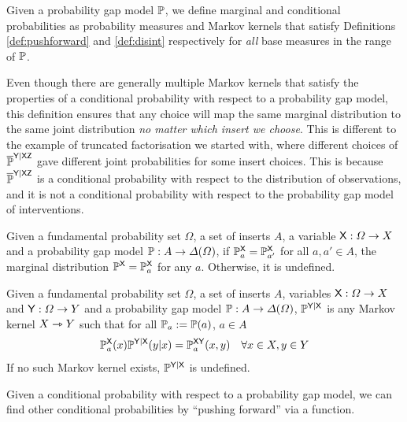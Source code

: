 Given a probability gap model $\mathbb{P}$, we define marginal and conditional probabilities as probability measures and Markov kernels that satisfy Definitions \ref{def:pushforward} and \ref{def:disint} respectively for \emph{all} base measures in the range of $\mathbb{P}$. 

Even though there are generally multiple Markov kernels that satisfy the properties of a conditional probability with respect to a probability gap model, this definition ensures that any choice will map the same marginal distribution to the same joint distribution \emph{no matter which insert we choose}. This is different to the example of truncated factorisation we started with, where different choices of $\overline{\mathbb{P}}^{\mathsf{Y}|\mathsf{XZ}}$ gave different joint probabilities for some insert choices. This is because $\overline{\mathbb{P}}^{\mathsf{Y}|\mathsf{XZ}}$ is a conditional probability with respect to the distribution of observations, and it is not a conditional probability with respect to the probability gap model of interventions.

\begin{definition}
Given a fundamental probability set $\Omega$, a set of inserts $A$, a variable $\mathsf{X}:\Omega\to X$ and a probability gap model $\mathbb{P}:A\to \Delta(\Omega)$, if $\mathbb{P}_a^{\mathsf{X}}=\mathbb{P}_{a'}^{\mathsf{X}}$ for all $a,a'\in A$, the marginal distribution $\mathbb{P}^{\mathsf{X}}=\mathbb{P}_a^{\mathsf{X}}$ for any $a$. Otherwise, it is undefined.
\end{definition}

\begin{definition}
Given a fundamental probability set $\Omega$, a set of inserts $A$, variables $\mathsf{X}:\Omega\to X$ and $\mathsf{Y}:\Omega\to Y$ and a probability gap model $\mathbb{P}:A\to \Delta(\Omega)$, $\mathbb{P}^{\mathsf{Y}|\mathsf{X}}$ is any Markov kernel $X\rightarrowtriangle Y$ such that for all $\mathbb{P}_a:=\mathbb{P}(a)$, $a\in A$
\begin{align}
	\mathbb{P}_a^{\mathsf{X}}(x)\mathbb{P}^{\mathsf{Y}|\mathsf{X}}(y|x)&= \mathbb{P}_a^{\mathsf{XY}}(x,y) &\forall x\in X, y\in Y
\end{align}
If no such Markov kernel exists, $\mathbb{P}^{\mathsf{Y}|\mathsf{X}}$ is undefined.
\end{definition}

Given a conditional probability with respect to a probability gap model, we can find other conditional probabilities by ``pushing forward'' via a function.

